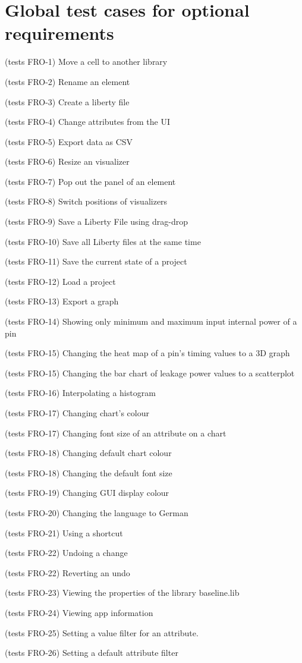 \documentclass[10pt,a4paper]{report}
\begin{document}
\section{Global test cases for optional requirements}
\begin{GTCO}
    \item  (tests FRO-1) Move a cell to another library
    \item  (tests FRO-2) Rename an element
    \item  (tests FRO-3) Create a liberty file
    \item  (tests FRO-4) Change attributes from the UI 
    \item  (tests FRO-5) Export data as CSV
    \item  (tests FRO-6) Resize an visualizer
    \item  (tests FRO-7) Pop out the panel of an element
    \item  (tests FRO-8) Switch positions of visualizers
    \item  (tests FRO-9) Save a Liberty File using drag-drop
    \item  (tests FRO-10) Save all Liberty files at the same time
    \item  (tests FRO-11) Save the current state of a project
    \item  (tests FRO-12) Load a project 
    \item  (tests FRO-13) Export a graph
    \item  (tests FRO-14) Showing only minimum and maximum input internal power of a pin
    \item  (tests FRO-15) Changing the heat map of a pin’s timing values to a 3D graph
    \item  (tests FRO-15) Changing the bar chart of leakage power values to a scatterplot
    \item  (tests FRO-16) Interpolating a histogram
    \item  (tests FRO-17)  Changing chart’s colour 
    \item  (tests FRO-17) Changing font size of an attribute on a chart
    \item  (tests FRO-18) Changing default chart colour 
    \item  (tests FRO-18) Changing the default font size
    \item  (tests FRO-19) Changing GUI display colour
    \item  (tests FRO-20) Changing the language to German
    \item  (tests FRO-21) Using a shortcut
    \item  (tests FRO-22) Undoing a change
    \item  (tests FRO-22) Reverting an undo
    \item  (tests FRO-23) Viewing the properties of the library baseline.lib
    \item  (tests FRO-24) Viewing app information
    \item  (tests FRO-25) Setting a value filter for an attribute.
    \item  (tests FRO-26) Setting a default attribute filter
    
\end{GTCO}
\end{document}
